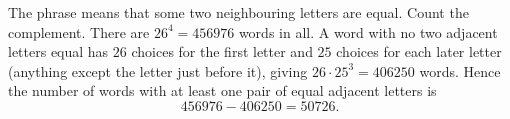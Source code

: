 The phrase means that some two neighbouring letters are equal. Count the complement. There are $26^4=456976$ words in all. A word with no two adjacent letters equal has $26$ choices for the first letter and $25$ choices for each later letter (anything except the letter just before it), giving $26\cdot25^3=406250$ words. Hence the number of words with at least one pair of equal adjacent letters is
\[456976-406250=\boxed{50726}.\]
